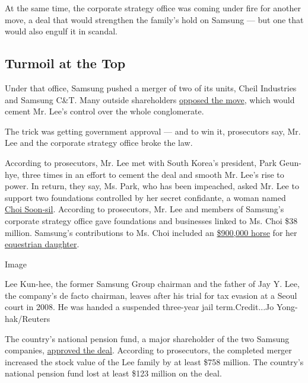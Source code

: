 At the same time, the corporate strategy office was coming under fire
for another move, a deal that would strengthen the family's hold on
Samsung --- but one that would also engulf it in scandal.

\hypertarget{turmoil-at-the-top}{%
\subsection{Turmoil at the Top}\label{turmoil-at-the-top}}

Under that office, Samsung pushed a merger of two of its units, Cheil
Industries and Samsung C\&T. Many outside shareholders
\href{https://www.nytimes3xbfgragh.onion/2015/06/05/business/dealbook/an-activist-investor-takes-aim-at-bid-for-samsung.html}{opposed
the move}, which would cement Mr. Lee's control over the whole
conglomerate.

The trick was getting government approval --- and to win it, prosecutors
say, Mr. Lee and the corporate strategy office broke the law.

According to prosecutors, Mr. Lee met with South Korea's president, Park
Geun-hye, three times in an effort to cement the deal and smooth Mr.
Lee's rise to power. In return, they say, Ms. Park, who has been
impeached, asked Mr. Lee to support two foundations controlled by her
secret confidante, a woman named
\href{https://www.nytimes3xbfgragh.onion/2016/10/28/world/asia/south-korea-choi-soon-sil.html}{Choi
Soon-sil}. According to prosecutors, Mr. Lee and members of Samsung's
corporate strategy office gave foundations and businesses linked to Ms.
Choi \$38 million. Samsung's contributions to Ms. Choi included an
\href{https://www.washingtonpost.com/world/samsung-scion-to-be-indicted-on-bribery-charges/2017/02/28/b5988fca-863c-4ca7-8b7d-9e105549d9a9_story.html?utm_term=.7eb096d19257}{\$900,000
horse} for her
\href{https://www.nytimes3xbfgragh.onion/2017/01/02/world/asia/south-korea-scandal-choi-soon-sil-daughter.html}{equestrian
daughter}.

Image

Lee Kun-hee, the former Samsung Group chairman and the father of Jay Y.
Lee, the company's de facto chairman, leaves after his trial for tax
evasion at a Seoul court in 2008. He was handed a suspended three-year
jail term.Credit...Jo Yong-hak/Reuters

The country's national pension fund, a major shareholder of the two
Samsung companies,
\href{https://www.nytimes3xbfgragh.onion/2016/12/31/world/asia/south-korea-samsung-merger-moon-hyung-pyo.html}{approved
the deal}. According to prosecutors, the completed merger increased the
stock value of the Lee family by at least \$758 million. The country's
national pension fund lost at least \$123 million on the deal.

